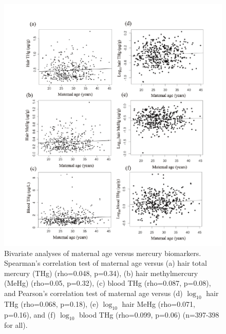 \begin{figure}
  \centering
    \label{fig:Fig36}
  \includegraphics[scale=1]{Figures/Fig36.pdf}
  \caption[Bivariate analyses of maternal age versus mercury biomarkers]{Bivariate analyses of maternal age versus mercury biomarkers. Spearman's correlation test of maternal age versus (a) hair total mercury (THg) (rho=0.048, p=0.34), (b) hair methylmercury (MeHg) (rho=0.05, p=0.32), (c) blood THg (rho=0.087, p=0.08), and Pearson's correlation test of maternal age versus (d) $\log_{10}$ hair THg (rho=0.068, p=0.18), (e) $\log_{10}$ hair MeHg (rho=0.071, p=0.16), and (f) $\log_{10}$ blood THg (rho=0.099, p=0.06) (n=397-398 for all).}
\end{figure}

